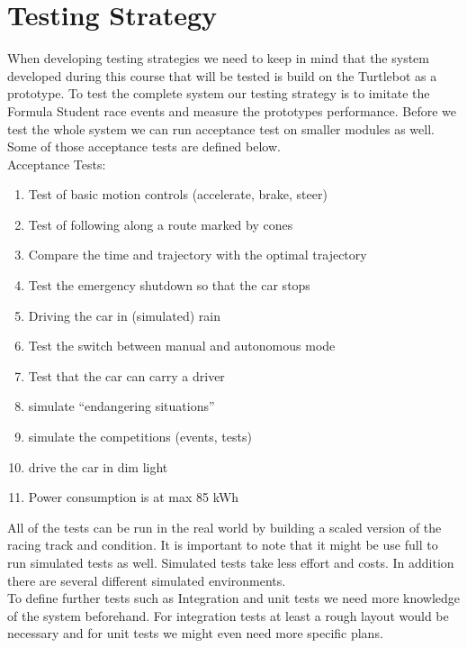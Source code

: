 \documentclass[12pt,a4paper,german]{article}
\begin{document}
\section{Testing Strategy}
    When developing testing strategies we need to keep in mind that the system developed during this course that will be tested is build on the Turtlebot as a prototype. To test the complete system our testing strategy is to imitate the Formula Student race events and measure the prototypes performance. Before we test the whole system we can run acceptance test on smaller modules as well. Some of those acceptance tests are defined below. \\
    Acceptance Tests:
    \begin{enumerate}[label=\arabic*.]
        \item Test of basic motion controls (accelerate, brake, steer)
        \item Test of following along a route marked by cones
        \item Compare the time and trajectory with the optimal trajectory
        \item Test the emergency shutdown so that the car stops 
        \item Driving the car in (simulated) rain
        \item Test the switch between manual and autonomous mode
        \item Test that the car can carry a driver
        \item simulate “endangering situations”
        \item simulate the competitions (events, tests)
        \item drive the car in dim light
        \item Power consumption is at max 85 kWh
    \end{enumerate}
    
    \noindent All of the tests can be run in the real world by building a scaled version of the racing track and condition. It is important to note that it might be use full to run simulated tests as well. Simulated tests take less effort and costs. In addition there are several different simulated environments. \\
    To define further tests such as Integration and unit tests we need more knowledge of the system beforehand. For integration tests at least a rough layout would be necessary and for unit tests we might even need more specific plans.
\end{document}
